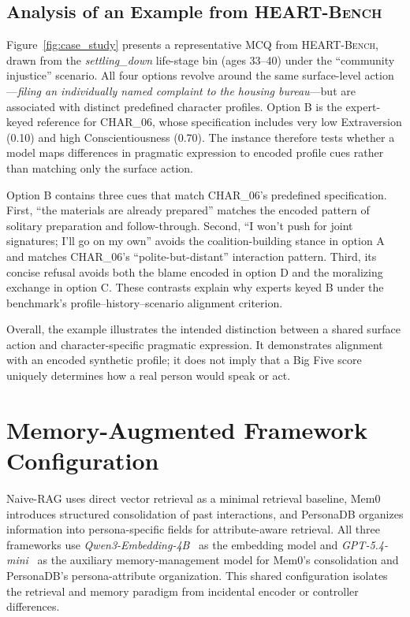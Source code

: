 \documentclass[11pt]{article}
\newcommand{\ourbench}[0]{\textsc{HEART-Bench}\xspace}
\begin{document}
\subsection{Analysis of an Example from \ourbench}
\label{app:case_study}

Figure~\ref{fig:case_study} presents a representative MCQ from \ourbench, drawn from the \emph{settling\_down} life-stage bin (ages 33--40) under the ``community injustice'' scenario. All four options revolve around the same surface-level action---\emph{filing an individually named complaint to the housing bureau}---but are associated with distinct predefined character profiles. Option B is the expert-keyed reference for CHAR\_06, whose specification includes very low Extraversion (0.10) and high Conscientiousness (0.70). The instance therefore tests whether a model maps differences in pragmatic expression to encoded profile cues rather than matching only the surface action.

Option B contains three cues that match CHAR\_06's predefined specification. First, ``the materials are already prepared'' matches the encoded pattern of solitary preparation and follow-through. Second, ``I won't push for joint signatures; I'll go on my own'' avoids the coalition-building stance in option A and matches CHAR\_06's ``polite-but-distant'' interaction pattern. Third, its concise refusal avoids both the blame encoded in option D and the moralizing exchange in option C. These contrasts explain why experts keyed B under the benchmark's profile--history--scenario alignment criterion.

Overall, the example illustrates the intended distinction between a shared surface action and character-specific pragmatic expression. It demonstrates alignment with an encoded synthetic profile; it does not imply that a Big Five score uniquely determines how a real person would speak or act.


\section{Memory-Augmented Framework Configuration}
\label{app:interactive_settings}
Naive-RAG uses direct vector retrieval as a minimal retrieval baseline, Mem0 introduces structured consolidation of past interactions, and PersonaDB organizes information into persona-specific fields for attribute-aware retrieval. All three frameworks use \textit{Qwen3-Embedding-4B}~\cite{qwen3embedding} as the embedding model and \textit{GPT-5.4-mini}~\cite{openai2026gpt54} as the auxiliary memory-management model for Mem0's consolidation and PersonaDB's persona-attribute organization. This shared configuration isolates the retrieval and memory paradigm from incidental encoder or controller differences.
\end{document}
